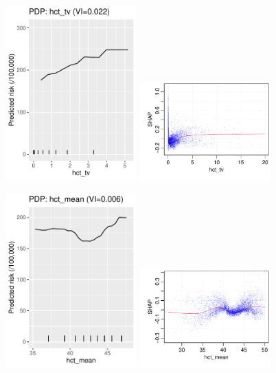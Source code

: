 \documentclass[12pt]{article}
\begin{document}
\begin{figure}[h]
\centering
\includegraphics[width=0.45\textwidth]{figures/pdp/hct_tv.pdf}
\includegraphics[width=0.45\textwidth]{figures/shap/hct_tv.pdf}
\end{figure}
\begin{figure}[h]
\centering
\includegraphics[width=0.45\textwidth]{figures/pdp/hct_mean.pdf}
\includegraphics[width=0.45\textwidth]{figures/shap/hct_mean.pdf}
\end{figure}
\end{document}
